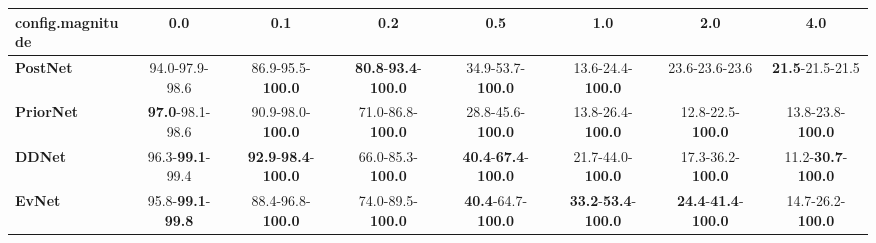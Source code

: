 \begin{tabular}{lccccccc}
\toprule
\textbf{config.magnitude} &                               0.0 &                                         0.1 &                                         0.2 &                                         0.5 &                                         1.0 &                                         2.0 &                                4.0 \\
\midrule
\textbf{PostNet } &                    94.0-97.9-98.6 &                    86.9-95.5-\textbf{100.0} &  \textbf{80.8}-\textbf{93.4}-\textbf{100.0} &                    34.9-53.7-\textbf{100.0} &                    13.6-24.4-\textbf{100.0} &                              23.6-23.6-23.6 &            \textbf{21.5}-21.5-21.5 \\
\textbf{PriorNet} &           \textbf{97.0}-98.1-98.6 &                    90.9-98.0-\textbf{100.0} &                    71.0-86.8-\textbf{100.0} &                    28.8-45.6-\textbf{100.0} &                    13.8-26.4-\textbf{100.0} &                    12.8-22.5-\textbf{100.0} &           13.8-23.8-\textbf{100.0} \\
\textbf{DDNet   } &           96.3-\textbf{99.1}-99.4 &  \textbf{92.9}-\textbf{98.4}-\textbf{100.0} &                    66.0-85.3-\textbf{100.0} &  \textbf{40.4}-\textbf{67.4}-\textbf{100.0} &                    21.7-44.0-\textbf{100.0} &                    17.3-36.2-\textbf{100.0} &  11.2-\textbf{30.7}-\textbf{100.0} \\
\textbf{EvNet   } &  95.8-\textbf{99.1}-\textbf{99.8} &                    88.4-96.8-\textbf{100.0} &                    74.0-89.5-\textbf{100.0} &           \textbf{40.4}-64.7-\textbf{100.0} &  \textbf{33.2}-\textbf{53.4}-\textbf{100.0} &  \textbf{24.4}-\textbf{41.4}-\textbf{100.0} &           14.7-26.2-\textbf{100.0} \\
\bottomrule
\end{tabular}
